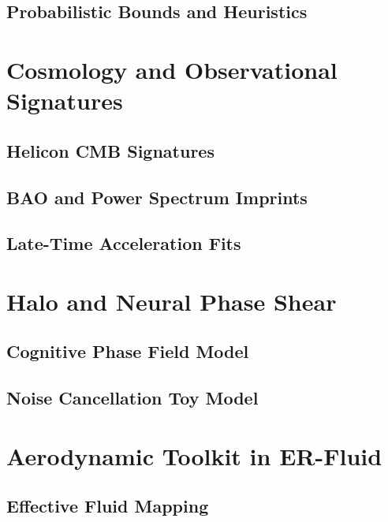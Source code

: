\subsection{Probabilistic Bounds and Heuristics}

\section{Cosmology and Observational Signatures}
\label{app:cosmology}

\subsection{Helicon CMB Signatures}

\subsection{BAO and Power Spectrum Imprints}

\subsection{Late-Time Acceleration Fits}

\section{Halo and Neural Phase Shear}
\label{app:halo}

\subsection{Cognitive Phase Field Model}

\subsection{Noise Cancellation Toy Model}

\section{Aerodynamic Toolkit in ER-Fluid}
\label{app:aero}

\subsection{Effective Fluid Mapping}

